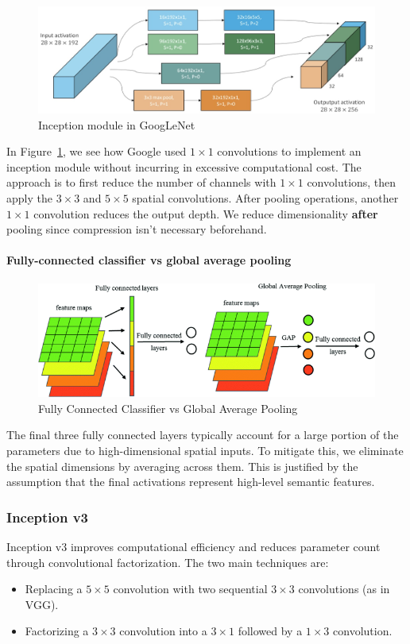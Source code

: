 \begin{figure}[htbp]
  \centering
  \includegraphics[width=0.8\linewidth]{./img/inception.jpg}
  \caption{Inception module in GoogLeNet}
  \label{fig:inception}
\end{figure}

In Figure~\ref{fig:inception}, we see how Google used $1\times 1$ convolutions to implement an inception module without incurring in excessive computational cost. The approach is to first reduce the number of channels with $1\times 1$ convolutions, then apply the $3 \times 3$ and $5 \times 5$ spatial convolutions. After pooling operations, another $1\times 1$ convolution reduces the output depth. We reduce dimensionality \textbf{after} pooling since compression isn't necessary beforehand.

\paragraph{Fully-connected classifier vs global average pooling}

\begin{figure}[htbp]
  \centering
  \includegraphics[width=0.6\linewidth]{./img/fc_vs_gap.png}
  \caption{Fully Connected Classifier vs Global Average Pooling}
\end{figure}

The final three fully connected layers typically account for a large portion of the parameters due to high-dimensional spatial inputs. To mitigate this, we eliminate the spatial dimensions by averaging across them. This is justified by the assumption that the final activations represent high-level semantic features.

\subsubsection{Inception v3}
Inception v3 improves computational efficiency and reduces parameter count through convolutional factorization. The two main techniques are:
\begin{itemize}
  \item Replacing a $5 \times 5$ convolution with two sequential $3 \times 3$ convolutions (as in VGG).
  \item Factorizing a $3 \times 3$ convolution into a $3\times 1$ followed by a $1 \times 3$ convolution.
\end{itemize}

